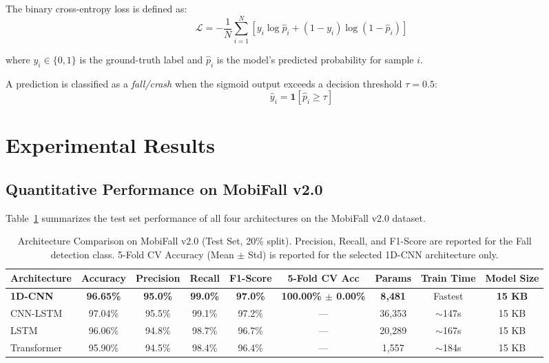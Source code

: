 \documentclass[journal]{IEEEtran}
\begin{document}
The binary cross-entropy loss is defined as:
\begin{equation}
  \mathcal{L} = -\frac{1}{N} \sum_{i=1}^{N}
  \left[ y_i \log \hat{p}_i + (1 - y_i) \log (1 - \hat{p}_i) \right]
  \label{eq:bce}
\end{equation}

where $y_i \in \{0, 1\}$ is the ground-truth label and $\hat{p}_i$ is the
model's predicted probability for sample $i$.

A prediction is classified as a \textit{fall/crash} when the sigmoid output
exceeds a decision threshold $\tau = 0.5$:
\begin{equation}
  \hat{y}_i = \mathbf{1}\!\left[\hat{p}_i \geq \tau\right]
  \label{eq:threshold}
\end{equation}


\section{Experimental Results}
\label{sec:results}

\subsection{Quantitative Performance on MobiFall v2.0}

Table~\ref{tab:model_comparison} summarizes the test set performance of all
four architectures on the MobiFall v2.0 dataset.

\begin{table}[!t]
\renewcommand{\arraystretch}{1.3}
\caption{Architecture Comparison on MobiFall v2.0 (Test Set, 20\% split). Precision, Recall, and F1-Score are reported for the Fall detection class. 5-Fold CV Accuracy (Mean $\pm$ Std) is reported for the selected 1D-CNN architecture only.}
\label{tab:model_comparison}
\centering
\begin{tabular}{lcccccccc}
\toprule
\textbf{Architecture} & \textbf{Accuracy} & \textbf{Precision} & \textbf{Recall} & \textbf{F1-Score} & \textbf{5-Fold CV Acc} & \textbf{Params} & \textbf{Train Time} & \textbf{Model Size} \\
\midrule
\textbf{1D-CNN} & \textbf{96.65\%} & \textbf{95.0\%} & \textbf{99.0\%} & \textbf{97.0\%} & \textbf{100.00\% $\pm$ 0.00\%} & \textbf{8,481}  & Fastest  & \textbf{15 KB} \\
CNN-LSTM        & 97.04\%          & 95.5\%          & 99.1\%          & 97.2\%          & ---                            & 36,353           & $\sim$147s & 15 KB \\
LSTM            & 96.06\%          & 94.8\%          & 98.7\%          & 96.7\%          & ---                            & 20,289           & $\sim$167s & 15 KB \\
Transformer     & 95.90\%          & 94.5\%          & 98.4\%          & 96.4\%          & ---                            & 1,557            & $\sim$184s & 15 KB \\
\bottomrule
\end{tabular}
\end{table}
\end{document}
